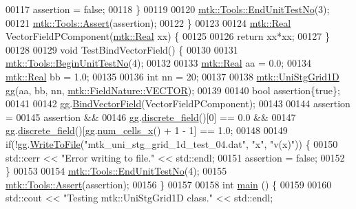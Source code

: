\begin{DoxyCode}
00117     assertion = \textcolor{keyword}{false};
00118   \}
00119 
00120   \hyperlink{classmtk_1_1Tools_aba67d9dc35c9c1c49430fcc9ea035e03}{mtk::Tools::EndUnitTestNo}(3);
00121   \hyperlink{classmtk_1_1Tools_ac6804df469c94ab6a796fb64f1e44a89}{mtk::Tools::Assert}(assertion);
00122 \}
00123 
00124 \hyperlink{group__c01-roots_gac080bbbf5cbb5502c9f00405f894857d}{mtk::Real} VectorFieldPComponent(\hyperlink{group__c01-roots_gac080bbbf5cbb5502c9f00405f894857d}{mtk::Real} xx) \{
00125 
00126   \textcolor{keywordflow}{return} xx*xx;
00127 \}
00128 
00129 \textcolor{keywordtype}{void} TestBindVectorField() \{
00130 
00131   \hyperlink{classmtk_1_1Tools_afc29ecaf337a13ed2e817d3890a5a441}{mtk::Tools::BeginUnitTestNo}(4);
00132 
00133   \hyperlink{group__c01-roots_gac080bbbf5cbb5502c9f00405f894857d}{mtk::Real} aa = 0.0;
00134   \hyperlink{group__c01-roots_gac080bbbf5cbb5502c9f00405f894857d}{mtk::Real} bb = 1.0;
00135 
00136   \textcolor{keywordtype}{int} nn = 20;
00137 
00138   \hyperlink{classmtk_1_1UniStgGrid1D}{mtk::UniStgGrid1D} gg(aa, bb, nn, \hyperlink{namespacemtk_ga4c54f2a329cfb4e56213b02a259d19e2a87752381b583740610f1dfeb07fdad7e}{mtk::FieldNature::VECTOR});
00139 
00140   \textcolor{keywordtype}{bool} assertion\{\textcolor{keyword}{true}\};
00141 
00142   gg.\hyperlink{classmtk_1_1UniStgGrid1D_a5703f1f875f52f6de8f7db5a6250fafa}{BindVectorField}(VectorFieldPComponent);
00143 
00144   assertion =
00145     assertion &&
00146     gg.\hyperlink{classmtk_1_1UniStgGrid1D_ab9c3f9ee2ac76a351b01e4abfede4d19}{discrete\_field}()[0] == 0.0 &&
00147     gg.\hyperlink{classmtk_1_1UniStgGrid1D_ab9c3f9ee2ac76a351b01e4abfede4d19}{discrete\_field}()[gg.\hyperlink{classmtk_1_1UniStgGrid1D_af1b3729d8afa07be5b2775ed68015b80}{num\_cells\_x}() + 1 - 1] == 1.0;
00148 
00149   \textcolor{keywordflow}{if}(!gg.\hyperlink{classmtk_1_1UniStgGrid1D_a6d2c10aa9468a037829f0eb043b898dc}{WriteToFile}(\textcolor{stringliteral}{"mtk\_uni\_stg\_grid\_1d\_test\_04.dat"}, \textcolor{stringliteral}{"x"}, \textcolor{stringliteral}{"v(x)"})) \{
00150     std::cerr << \textcolor{stringliteral}{"Error writing to file."} << std::endl;
00151     assertion = \textcolor{keyword}{false};
00152   \}
00153 
00154   \hyperlink{classmtk_1_1Tools_aba67d9dc35c9c1c49430fcc9ea035e03}{mtk::Tools::EndUnitTestNo}(4);
00155   \hyperlink{classmtk_1_1Tools_ac6804df469c94ab6a796fb64f1e44a89}{mtk::Tools::Assert}(assertion);
00156 \}
00157 
00158 \textcolor{keywordtype}{int} \hyperlink{mtk__uni__stg__grid__1d__test_8cc_ae66f6b31b5ad750f1fe042a706a4e3d4}{main} () \{
00159 
00160   std::cout << \textcolor{stringliteral}{"Testing mtk::UniStgGrid1D class."} << std::endl;

\end{DoxyCode}
